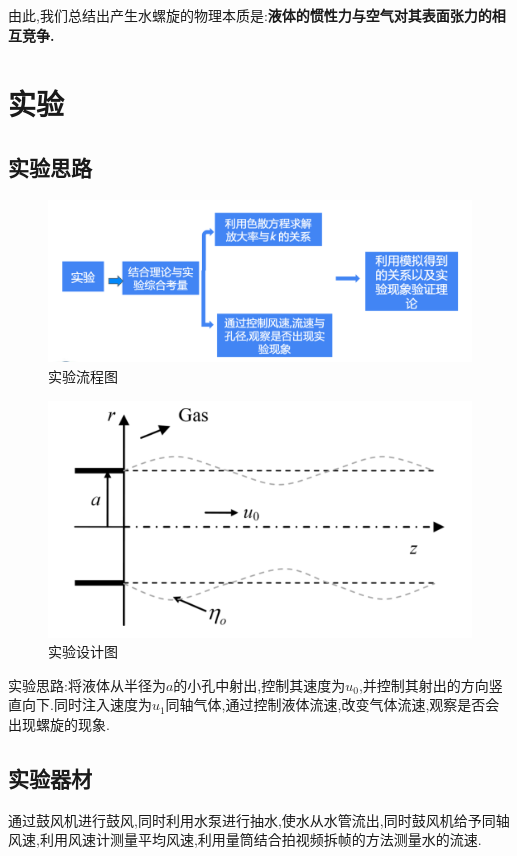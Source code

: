 \documentclass[UTF8]{gapd}
\begin{document}
由此,我们总结出产生水螺旋的物理本质是:\textbf{液体的惯性力与空气对其表面张力的相互竞争.}
\section{实验}
\label{sec:Experiment}
\subsection{实验思路}
\begin{figure}[h]%
	\centering
\includegraphics[width=0.9\columnwidth]{images/实验流程图}
	\caption{实验流程图}
	\label{fig:P5}%
\end{figure}
\begin{figure}[h]%
	\centering
	\includegraphics[width=0.9\columnwidth]{images/实验图}
	\caption{实验设计图\cite{c3}}
	\label{fig:P6}%
\end{figure}

实验思路:将液体从半径为$a$的小孔中射出,控制其速度为$u_{0}$,并控制其射出的方向竖直向下.同时注入速度为$u_{1}$同轴气体,通过控制液体流速,改变气体流速,观察是否会出现螺旋的现象.
\subsection{实验器材}

通过鼓风机进行鼓风,同时利用水泵进行抽水,使水从水管流出,同时鼓风机给予同轴风速,利用风速计测量平均风速,利用量筒结合拍视频拆帧的方法测量水的流速.
\end{document}
